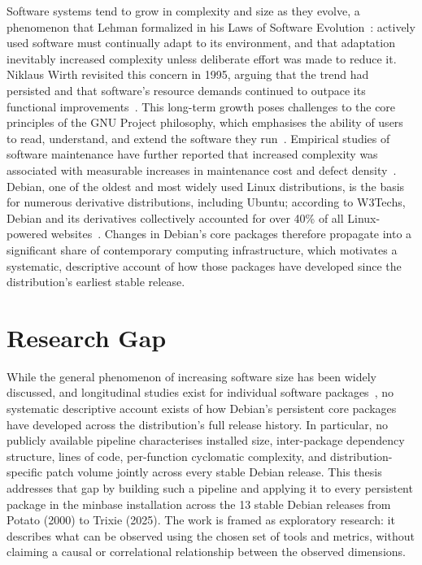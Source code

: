 Software systems tend to grow in complexity and size as they evolve, a phenomenon that Lehman formalized in his Laws of Software Evolution~\cite{Lehman1980Laws}: actively used software must continually adapt to its environment, and that adaptation inevitably increased complexity unless deliberate effort was made to reduce it. Niklaus Wirth revisited this concern in 1995, arguing that the trend had persisted and that software's resource demands continued to outpace its functional improvements~\cite{Wirth1995Plea}. This long-term growth poses challenges to the core principles of the GNU Project philosophy, which emphasises the ability of users to read, understand, and extend the software they run~\cite{Sherlock2018OpenSS}. Empirical studies of software maintenance have further reported that increased complexity was associated with measurable increases in maintenance cost and defect density~\cite{nguyen2017impact}. Debian, one of the oldest and most widely used Linux distributions, is the basis for numerous derivative distributions, including Ubuntu; according to W3Techs, Debian and its derivatives collectively accounted for over 40\% of all Linux-powered websites~\cite{W3Techs2024Linux}. Changes in Debian's core packages therefore propagate into a significant share of contemporary computing infrastructure, which motivates a systematic, descriptive account of how those packages have developed since the distribution's earliest stable release.

\section*{Research Gap}
While the general phenomenon of increasing software size has been widely discussed, and longitudinal studies exist for individual software packages~\cite{molnar2020longitudinal}, no systematic descriptive account exists of how Debian's persistent core packages have developed across the distribution's full release history. In particular, no publicly available pipeline characterises installed size, inter-package dependency structure, lines of code, per-function cyclomatic complexity, and distribution-specific patch volume jointly across every stable Debian release. This thesis addresses that gap by building such a pipeline and applying it to every persistent package in the minbase installation across the 13 stable Debian releases from Potato (2000) to Trixie (2025). The work is framed as exploratory research: it describes what can be observed using the chosen set of tools and metrics, without claiming a causal or correlational relationship between the observed dimensions.

